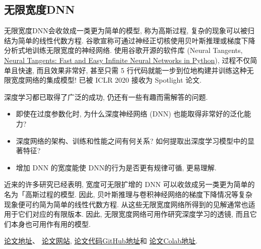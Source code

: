 \subsection{无限宽度DNN}
无限宽度DNN会收敛成一类更为简单的模型, 称为高斯过程, 复杂的现象可以被归结为简单的线性代数方程.
谷歌宣称可通过神经正切核使用贝叶斯推理或梯度下降分析式地训练无限宽度的神经网络.
使用谷歌开源的软件库 (Neural Tangents, \href{www.github.com/google/neural-tangents}{Neural Tangents: Fast and Easy Infinite Neural Networks in Python}),
过程不仅简单且快速, 而且效果非常好, 甚至只需 5 行代码就能一步到位地构建并训练这种无限宽度网络的集成模型!
已被 ICLR 2020 接收为 Spotlight 论文.

\begin{remark}
    深度学习都已取得了广泛的成功, 仍还有一些有趣而需解答的问题.
\begin{itemize}
    \item 即使在过度参数化时, 为什么深度神经网络 (DNN) 也能取得非常好的泛化能力?
    \item 深度网络的架构、训练和性能之间有何关系? 如何提取出深度学习模型中的显著特征?
    \item 增加 DNN 的宽度能使 DNN的行为是否更有规律可循, 更易理解.
\end{itemize}

近来的许多研究已经表明, 宽度可无限扩增的 DNN 可以收敛成另一类更为简单的名为「高斯过程的模型.
因此, 贝叶斯推理与卷积神经网络的梯度下降情况等复杂现象便可约简为简单的线性代数方程.
从这些无限宽度网络所得到的见解通常也适用于它们对应的有限版本.
因此, 无限宽度网络可用作研究深度学习的透镜, 而且它们本身也可用作有用的模型.
\end{remark}
\begin{remark}
\href{https://arxiv.org/abs/1912.02803}{论文地址}、
\href{https://ai.googleblog.com/2020/03/fast-and-easy-infinitely-wide-networks.html}{论文网站},
\href{https://github.com/google/neural-tangents}{论文代码GitHub地址}和
\href{https://colab.research.google.com/github/google/neural-tangents/blob/master/notebooks/neural_tangents_cookbook.ipynb}{论文Colab地址}.
\end{remark}
